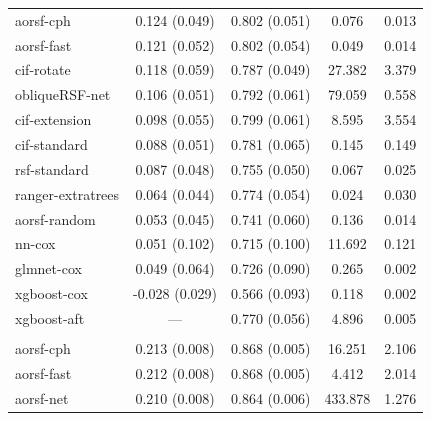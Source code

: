 \documentclass{article}\usepackage[]{graphicx}\usepackage[]{xcolor}
\newenvironment{knitrout}{}{} %
\begin{document}
\begin{knitrout}
\begin{longtable}[t]{lcccc}
\hspace{1em}aorsf-cph & 0.124 (0.049) & 0.802 (0.051) & 0.076 & 0.013\\
\hspace{1em}aorsf-fast & 0.121 (0.052) & 0.802 (0.054) & 0.049 & 0.014\\
\hspace{1em}cif-rotate & 0.118 (0.059) & 0.787 (0.049) & 27.382 & 3.379\\
\hspace{1em}obliqueRSF-net & 0.106 (0.051) & 0.792 (0.061) & 79.059 & 0.558\\
\hspace{1em}cif-extension & 0.098 (0.055) & 0.799 (0.061) & 8.595 & 3.554\\
\hspace{1em}cif-standard & 0.088 (0.051) & 0.781 (0.065) & 0.145 & 0.149\\
\hspace{1em}rsf-standard & 0.087 (0.048) & 0.755 (0.050) & 0.067 & 0.025\\
\hspace{1em}ranger-extratrees & 0.064 (0.044) & 0.774 (0.054) & 0.024 & 0.030\\
\hspace{1em}aorsf-random & 0.053 (0.045) & 0.741 (0.060) & 0.136 & 0.014\\
\hspace{1em}nn-cox & 0.051 (0.102) & 0.715 (0.100) & 11.692 & 0.121\\
\hspace{1em}glmnet-cox & 0.049 (0.064) & 0.726 (0.090) & 0.265 & 0.002\\
\hspace{1em}xgboost-cox & -0.028 (0.029) & 0.566 (0.093) & 0.118 & 0.002\\
\hspace{1em}xgboost-aft & --- & 0.770 (0.056) & 4.896 & 0.005\\
\addlinespace[0.3em]
\multicolumn{5}{l}{\textit{\textbf{Non-alcohol fatty liver disease; death, n = 17549, p = 24}}}\\
\hline
\hspace{1em}aorsf-cph & 0.213 (0.008) & 0.868 (0.005) & 16.251 & 2.106\\
\hspace{1em}aorsf-fast & 0.212 (0.008) & 0.868 (0.005) & 4.412 & 2.014\\
\hspace{1em}aorsf-net & 0.210 (0.008) & 0.864 (0.006) & 433.878 & 1.276\\

\end{longtable}
\end{knitrout}
\end{document}
